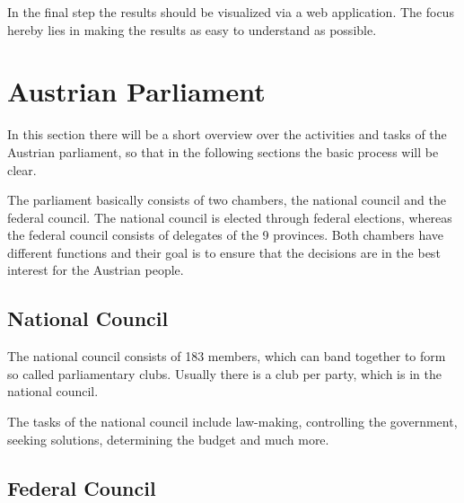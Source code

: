 In the final step the results should be visualized via a web application. The focus hereby lies in making the results as easy to understand as possible.

\section{Austrian Parliament}
In this section there will be a short overview over the activities and tasks of the Austrian parliament, so that in the following sections the basic process will be clear.

The parliament basically consists of two chambers, the national council and the federal council. The national council is elected through federal elections, whereas the federal council consists of delegates of the 9 provinces. Both chambers have different functions and their goal is to ensure that the decisions are in the best interest for the Austrian people.

\subsection{National Council}
The national council consists of 183 members, which can band together to form so called parliamentary clubs. Usually there is a club per party, which is in the national council.

The tasks of the national council include law-making, controlling the government, seeking solutions, determining the budget and much more. 

\subsection{Federal Council}
